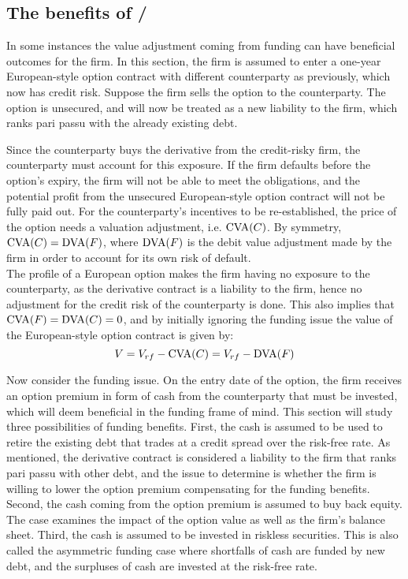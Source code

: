 \documentclass[../main.tex]{subfiles}
\begin{document}
    \subsection{The benefits of \FVA/}
        In some instances the value adjustment coming from funding can have beneficial outcomes for the firm.
        In this section, the firm is assumed to enter a one-year European-style option contract with different counterparty as previously,
        which now has credit risk.
        Suppose the firm sells the option to the counterparty. The option is unsecured, and will now be treated as a new liability to the firm, which ranks pari passu with the already existing debt.

        Since the counterparty buys the derivative from the credit-risky firm, the counterparty must account for this exposure. If the firm defaults before the option's expiry, the firm will not be able to meet the obligations, and the potential profit from the unsecured European-style option contract will not be fully paid out. For the counterparty's incentives to be re-established, the price of the option needs a valuation adjustment, i.e. $\text{\CVA/}(C)$. By symmetry, $\text{\CVA/}(C) = \text{\DVA/}(F)$, where $\text{\DVA/}(F)$ is the debit value adjustment made by the firm in order to account for its own risk of default.\\
        The profile of a European option makes the firm having no exposure to the counterparty, as the derivative contract is a liability to the firm, hence no adjustment for the credit risk of the counterparty is done. This also implies that $\text{\CVA/}(F) = \text{\DVA/}(C) = 0$, and by initially ignoring the funding issue the value of the European-style option contract is given by:
        \begin{equation}\label{eqn:option-value-credit-risk}
            V = V_{rf} - \text{\CVA/}(C) = V_{rf} - \text{\DVA/}(F)
        \end{equation}

        Now consider the funding issue. On the entry date of the option, the firm receives an option premium in form of cash from the counterparty that must be invested, which will deem beneficial in the funding frame of mind. This section will study three possibilities of funding benefits. First, the cash is assumed to be used to retire the existing debt that trades at a credit spread over the risk-free rate. As mentioned, the derivative contract is considered a liability to the firm that ranks pari passu with other debt, and the issue to determine is whether the firm is willing to lower the option premium compensating for the funding benefits. Second, the cash coming from the option premium is assumed to buy back equity. The case examines the impact of the option value as well as the firm's balance sheet. Third, the cash is assumed to be invested in riskless securities. This is also called the asymmetric funding case where shortfalls of cash are funded by new debt, and the surpluses of cash are invested at the risk-free rate.
\end{document}
